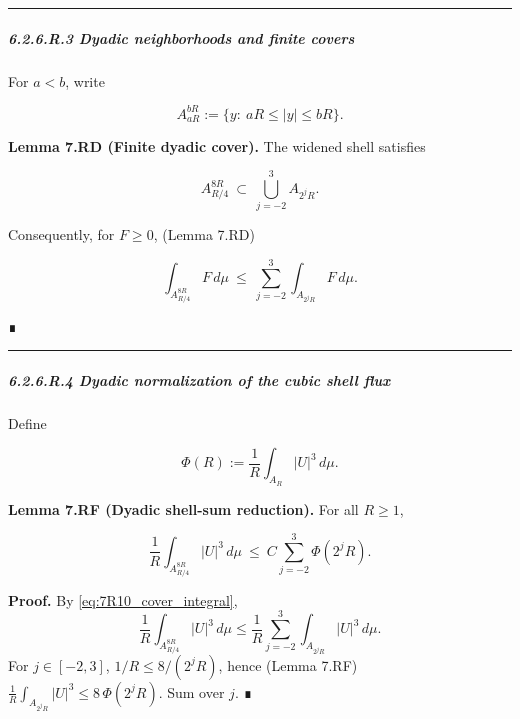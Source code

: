 \documentclass[
  11pt,
]{article}
\begin{document}
\begin{center}\rule{0.5\linewidth}{0.5pt}\end{center}

\hypertarget{r.3-dyadic-neighborhoods-and-finite-covers}{%
\subparagraph{6.2.6.R.3 Dyadic neighborhoods and finite covers}\label{r.3-dyadic-neighborhoods-and-finite-covers}}

For \(a<b\), write

\begin{equation}
A_{aR}^{bR}:=\{y:\ aR\le |y|\le bR\}.
\tag{7.R8}\label{eq:7R8_shell_neighborhood}
\end{equation}

\textbf{Lemma 7.RD (Finite dyadic cover).} The widened shell satisfies

\begin{equation}
A_{R/4}^{8R}\ \subset\ \bigcup_{j=-2}^{3} A_{2^jR}.
\tag{7.R9}\label{eq:7R9_dyadic_cover}
\end{equation}

Consequently, for \(F\ge 0\), (Lemma 7.RD)

\begin{equation}
\int_{A_{R/4}^{8R}} F\,d\mu\ \le\ \sum_{j=-2}^{3}\int_{A_{2^jR}}F\,d\mu.
\tag{7.R10}\label{eq:7R10_cover_integral}
\end{equation}

∎

\begin{center}\rule{0.5\linewidth}{0.5pt}\end{center}

\hypertarget{r.4-dyadic-normalization-of-the-cubic-shell-flux}{%
\subparagraph{6.2.6.R.4 Dyadic normalization of the cubic shell flux}\label{r.4-dyadic-normalization-of-the-cubic-shell-flux}}

Define

\begin{equation}
\Phi(R):=\frac{1}{R}\int_{A_R}|U|^3\,d\mu.
\tag{7.R11}\label{eq:7R11_phi_def}
\end{equation}

\textbf{Lemma 7.RF (Dyadic shell-sum reduction).} For all \(R\ge 1\),

\begin{equation}
\frac{1}{R}\int_{A_{R/4}^{8R}}|U|^3\,d\mu
\ \le\
C\sum_{j=-2}^{3}\Phi(2^jR).
\tag{7.R12}\label{eq:7R12_shellsum_to_flux}
\end{equation}

\textbf{Proof.} By \eqref{eq:7R10_cover_integral}, \[
\frac{1}{R}\int_{A_{R/4}^{8R}}|U|^3\,d\mu
\le
\frac{1}{R}\sum_{j=-2}^{3}\int_{A_{2^jR}}|U|^3\,d\mu.
\] For \(j\in[-2,3]\), \(1/R\le 8/(2^jR)\), hence (Lemma 7.RF) \(\frac{1}{R}\int_{A_{2^jR}}|U|^3 \le 8\,\Phi(2^jR)\). Sum over \(j\). ∎
\end{document}
